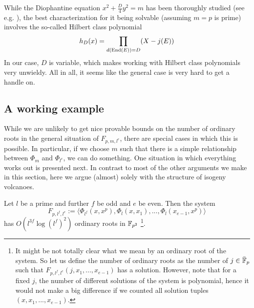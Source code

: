 While the Diophantine equation $x^2 + \frac D 4 y^2 = m$ has been thoroughly studied (see e.g. \cite{cox_primes_of_form}), the best characterization for it being solvable (assuming $m = p$ is prime) involves the so-called Hilbert class polynomial
\begin{equation*}
    h_D(x) = \prod_{d(\mathrm{End}(E)) = D} (X - j(E))
\end{equation*}
In our case, $D$ is variable, which makes working with Hilbert class polynomials very unwieldy.
All in all, it seems like the general case is very hard to get a handle on.

\subsection{A working example}
While we are unlikely to get nice provable bounds on the number of ordinary roots in the general situation of $F_{p, m, l^e}$, there are special cases in which this is possible.
In particular, if we choose $m$ such that there is a simple relationship between $\Phi_m$ and $\Phi_{l^e}$, we can do something.
One situation in which everything works out is presented next.
In contrast to most of the other arguments we make in this section, here we argue (almost) solely with the structure of isogeny volcanoes.
\begin{prop}
    Let $l$ be a prime and further $f$ be odd and $e$ be even.
    Then the system
    \begin{equation*}
        F_{p, l^f, l^e} := \langle \Phi_{l^f}(x, x^p), \Phi_l(x, x_1), ..., \Phi_l(x_{e - 1}, x^p) \rangle
    \end{equation*}
    has $O(l^{3f}\log(l^f)^2)$ ordinary roots in $\mathbb{F}_{p^2}$
    \footnote{It might be not totally clear what we mean by an ordinary root of the system.
    So let us define the number of ordinary roots as the number of $j \in \bar{\mathbb{F}}_p$ such that $F_{p, l^f, l^e}(j, x_1, ..., x_{e - 1})$ has a solution.
    However, note that for a fixed $j$, the number of different solutions of the system is polynomial, hence it would not make a big difference if we counted all solution tuples $(x, x_1, ..., x_{e - 1})$.}.
\end{prop}

